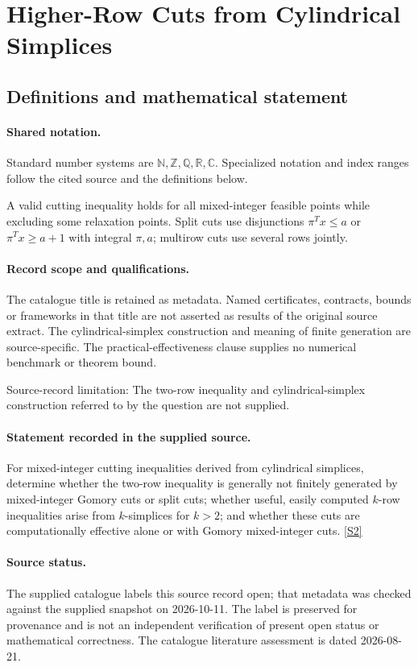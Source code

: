 \documentclass[11pt]{article}
\newcommand{\sref}[2]{\hyperlink{source:#1:#2}{[S#2]}}
\begin{document}
\section{Higher-Row Cuts from Cylindrical Simplices}\label{statement}

\subsection{Definitions and mathematical statement}

\paragraph{Shared notation.}Standard number systems are $\mathbb N,\mathbb Z,\mathbb Q,\mathbb R,\mathbb C$. Specialized notation and index ranges follow the cited source and the definitions below.


A valid cutting inequality holds for all mixed-integer feasible points while excluding some relaxation points. Split cuts use disjunctions $\pi^Tx\leq a$ or $\pi^Tx\geq a+1$ with integral $\pi,a$; multirow cuts use several rows jointly.
\paragraph{Record scope and qualifications.}
The catalogue title is retained as metadata. Named certificates, contracts, bounds or frameworks in that title are not asserted as results of the original source extract.
The cylindrical-simplex construction and meaning of finite generation are source-specific. The practical-effectiveness clause supplies no numerical benchmark or theorem bound.

Source-record limitation: The two-row inequality and cylindrical-simplex construction referred to by the question are not supplied.
\paragraph{Statement recorded in the supplied source.}
For mixed-integer cutting inequalities derived from cylindrical simplices, determine whether the two-row inequality is generally not finitely generated by mixed-integer Gomory cuts or split cuts; whether useful, easily computed $k$-row inequalities arise from $k$-simplices for $k>2$; and whether these cuts are computationally effective alone or with Gomory mixed-integer cuts. \sref{statement}{2}
\paragraph{Source status.}
The supplied catalogue labels this source record open; that metadata was checked against the supplied snapshot on 2026-10-11. The label is preserved for provenance and is not an independent verification of present open status or mathematical correctness. The catalogue literature assessment is dated 2026-08-21.
\end{document}
